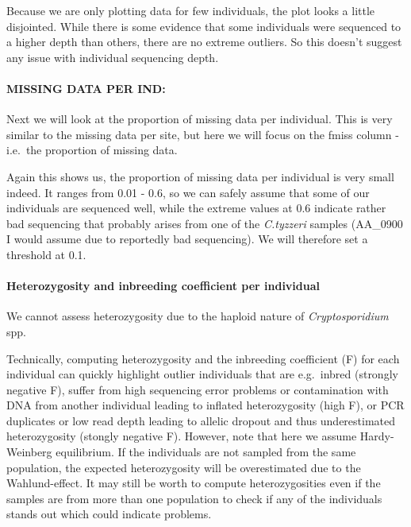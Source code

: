\documentclass[
]{article}
\begin{document}
Because we are only plotting data for few individuals, the plot looks a
little disjointed. While there is some evidence that some individuals
were sequenced to a higher depth than others, there are no extreme
outliers. So this doesn't suggest any issue with individual sequencing
depth.

\hypertarget{missing-data-per-ind}{%
\paragraph{MISSING DATA PER IND:}\label{missing-data-per-ind}}

Next we will look at the proportion of missing data per individual. This
is very similar to the missing data per site, but here we will focus on
the fmiss column - i.e.~the proportion of missing data.

Again this shows us, the proportion of missing data per individual is
very small indeed. It ranges from 0.01 - 0.6, so we can safely assume
that some of our individuals are sequenced well, while the extreme
values at 0.6 indicate rather bad sequencing that probably arises from
one of the \emph{C.tyzzeri} samples (AA\_0900 I would assume due to
reportedly bad sequencing). We will therefore set a threshold at 0.1.

\hypertarget{heterozygosity-and-inbreeding-coefficient-per-individual}{%
\paragraph{Heterozygosity and inbreeding coefficient per
individual}\label{heterozygosity-and-inbreeding-coefficient-per-individual}}

We cannot assess heterozygosity due to the haploid nature of
\emph{Cryptosporidium} spp.

Technically, computing heterozygosity and the inbreeding coefficient (F)
for each individual can quickly highlight outlier individuals that are
e.g.~inbred (strongly negative F), suffer from high sequencing error
problems or contamination with DNA from another individual leading to
inflated heterozygosity (high F), or PCR duplicates or low read depth
leading to allelic dropout and thus underestimated heterozygosity
(stongly negative F). However, note that here we assume Hardy-Weinberg
equilibrium. If the individuals are not sampled from the same
population, the expected heterozygosity will be overestimated due to the
Wahlund-effect. It may still be worth to compute heterozygosities even
if the samples are from more than one population to check if any of the
individuals stands out which could indicate problems.
\end{document}
